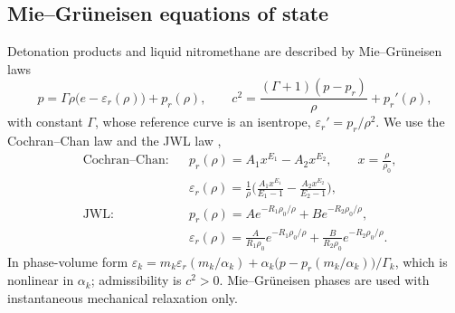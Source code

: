 \subsection{Mie--Gr\"uneisen equations of state}
\label{sec:mg}
Detonation products and liquid nitromethane are described by Mie--Gr\"un\-ei\-sen laws
\begin{equation}
p=\Gamma\rho\big(e-\varepsilon_r(\rho)\big)+p_r(\rho),\qquad c^2=\frac{(\Gamma+1)(p-p_r)}{\rho}+p_r'(\rho),
\label{eq:mg}
\end{equation}
with constant $\Gamma$, whose reference curve is an isentrope, $\varepsilon_r'=p_r/\rho^2$. We use the Cochran--Chan law
\cite{CochranChan1979} and the JWL law \cite{LeeHornigKury1968},
\begin{equation}
\begin{aligned}
&\text{Cochran--Chan:}&& p_r(\rho)=A_1x^{E_1}-A_2x^{E_2},\qquad x=\frac\rho{\rho_0},\\
&&&\varepsilon_r(\rho)=\frac1\rho\Big(\frac{A_1x^{E_1}}{E_1-1}-\frac{A_2x^{E_2}}{E_2-1}\Big),\\
&\text{JWL:}&& p_r(\rho)=Ae^{-R_1\rho_0/\rho}+Be^{-R_2\rho_0/\rho},\\
&&&\varepsilon_r(\rho)=\frac{A}{R_1\rho_0}e^{-R_1\rho_0/\rho}+\frac{B}{R_2\rho_0}e^{-R_2\rho_0/\rho}.
\end{aligned}
\label{eq:mg_ref}
\end{equation}
In phase-volume form $\varepsilon_k=m_k\varepsilon_r(m_k/\alpha_k)+\alpha_k\big(p-p_r(m_k/\alpha_k)\big)/\Gamma_k$, which is nonlinear in $\alpha_k$; admissibility
is $c^2>0$. Mie--Gr\"uneisen phases are used with instantaneous mechanical relaxation only.

